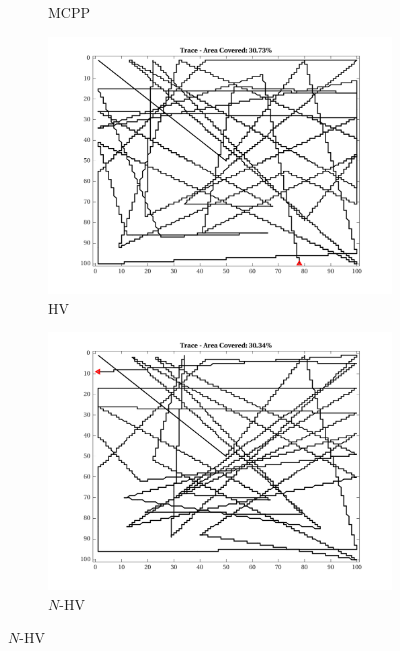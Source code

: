 \begin{figure}[htb!]
\begin{subfigure}[t]{0.25\textwidth}
        \captionsetup{skip=0.20\baselineskip,size=footnotesize}
        \caption{MCPP}
    \end{subfigure}%
    \begin{subfigure}[t]{0.25\textwidth}
        \centering
        \includegraphics[width=\linewidth]{figures/path_nhv_30p_100x100_sf_50_seed_1.png}
        \captionsetup{skip=0.20\baselineskip,size=footnotesize}
        \caption{HV}
    \end{subfigure}%
    \begin{subfigure}[t]{0.25\textwidth}
        \centering
        \includegraphics[width=\linewidth]{figures/path_nnhv_30p_100x100_sf_50_seed_1.png}
        \captionsetup{skip=0.20\baselineskip,size=footnotesize}
        \caption{$N$-HV}

\end{subfigure}
\end{figure}

